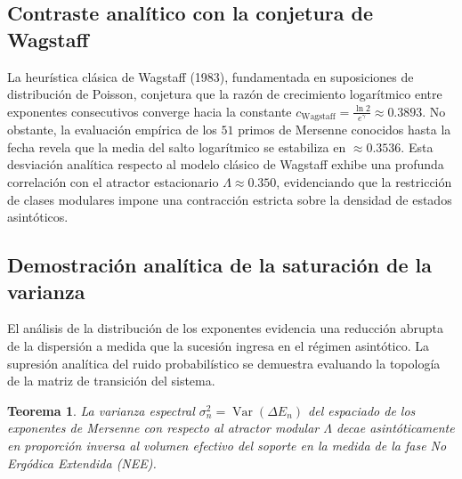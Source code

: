 \documentclass{article}
\numberwithin{equation}{section}
\DeclareMathOperator{\Var}{Var}
\theoremstyle{plain}
\newtheorem{teorema}{Teorema}[section]
\theoremstyle{definition}
\begin{document}
\subsection{Contraste analítico con la conjetura de Wagstaff}

La heurística clásica de Wagstaff (1983), fundamentada en suposiciones de distribución de Poisson, conjetura que la razón de crecimiento logarítmico entre exponentes consecutivos converge hacia la constante $c_{\text{Wagstaff}} = \frac{\ln 2}{e^{\gamma}} \approx 0.3893$. No obstante, la evaluación empírica de los $51$ primos de Mersenne conocidos hasta la fecha revela que la media del salto logarítmico se estabiliza en $\approx 0.3536$. Esta desviación analítica respecto al modelo clásico de Wagstaff exhibe una profunda correlación con el atractor estacionario $\Lambda \approx 0.350$, evidenciando que la restricción de clases modulares impone una contracción estricta sobre la densidad de estados asintóticos.

\subsection{Demostración analítica de la saturación de la varianza}

El análisis de la distribución de los exponentes evidencia una reducción abrupta de la dispersión a medida que la sucesión ingresa en el régimen asintótico. La supresión analítica del ruido probabilístico se demuestra evaluando la topología de la matriz de transición del sistema.

\begin{teorema}
\label{teo:saturacion_varianza}
La varianza espectral $\sigma^2_n = \Var(\Delta E_n)$ del espaciado de los exponentes de Mersenne con respecto al atractor modular $\Lambda$ decae asintóticamente en proporción inversa al volumen efectivo del soporte en la medida de la fase No Ergódica Extendida (NEE).
\end{teorema}
\end{document}
